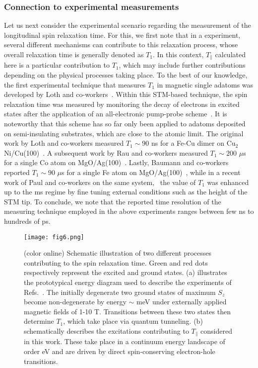 \documentclass[prb,footinbib,showpacs,twocolumn,amsmath,amssymb]{revtex4}
\begin{document}
\subsubsection{Connection to experimental measurements}
\label{subsubsec:long}





Let us next consider the experimental 
scenario regarding the measurement of the
longitudinal spin relaxation time.
For this, we first note that in a experiment,
several different mechanisms can contribute to this relaxation process,
whose overall relaxation time is generally denoted as $T_{1}$.
In this context, $T_{\parallel}$ calculated here is a particular
contribution to $T_{1}$, which may include further contributions depending on the
physical processes taking place. 
To the best of our knowledge, the first experimental 
technique that measures $T_{1}$  in magnetic single adatoms was developed by
Loth and co-workers~\cite{loth_measurement_2010}.
Within this STM-based technique, the spin relaxation time was measured 
by monitoring the decay of electrons in excited states after the application of an 
all-electronic pump-probe scheme~\cite{loth_measurement_2010}.
It is noteworthy that this scheme has so far only been applied 
to adatoms deposited on semi-insulating substrates, which  are  
close to the atomic limit.
The original work by Loth and co-workers measured $T_{1}\sim90$ ns for a Fe-Cu dimer on
$\text{Cu}_{2}$Ni/Cu(100)~\cite{loth_measurement_2010}. 
A subsequent work by Rau and co-workers measured  $T_{1}\sim200$ $\mu$s
for a single Co atom on MgO/Ag(100)~\cite{rau_reaching_2014}.
Lastly, Baumann and co-workers reported 
$T_{1}\sim90$ $\mu$s for a single Fe atom on MgO/Ag(100)~\cite{baumann_electron_2015},
while in a recent work of Paul and co-workers on the same system,~\cite{paul_control_2017} 
the value of $T_{1}$ was enhanced up to the ms regime by fine tuning
external conditions such as the height of the STM tip. 
To conclude, we note that the reported 
time resolution of the measuring technique employed in the above experiments 
ranges between few ns to hundreds of ps.


\begin{figure}[t]
\texttt{[image: fig6.png]}
\caption{(color online) Schematic illustration
of two different processes contributing to 
the spin relaxation time.
Green and red dots respectively represent the excited and ground states.
(a) illustrates the prototypical energy diagram  
used to describe the experiments of 
Refs.~.
The initially degenerate two ground states of maximum $S_{z}$ become non-degenerate
by energy $\sim$ meV under externally applied magnetic fields of 1-10 T.
Transitions between these two states then determine $T_{1}$,
which take place via quantum tunneling. 
(b) schematically describes the 
excitations contributing to $T_{\parallel}$
considered in this work. These take place in a continuum energy landscape of 
order eV and are driven by direct spin-conserving electron-hole transitions.
}
\label{fig:E-diagram}
\end{figure}
\end{document}
